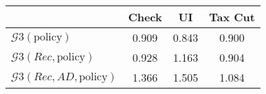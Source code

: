 \begin{tabular}{@{}lccc@{}}
\toprule
                          & Check      & UI    & Tax Cut    \\  \midrule
$\mathcal{G}3(\text{policy})$ & 0.909  & 0.843  & 0.900     \\
$\mathcal{G}3(Rec,\text{policy})$ & 0.928  & 1.163  & 0.904     \\
$\mathcal{G}3(Rec, AD,\text{policy})$ & 1.366  & 1.505  & 1.084     \\
\end{tabular}
